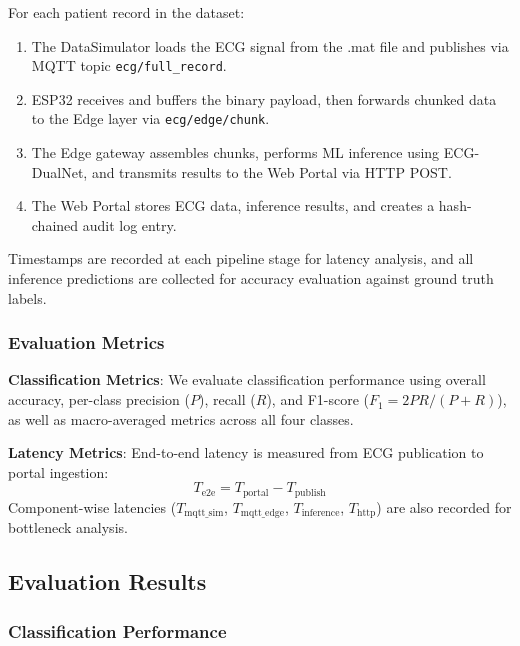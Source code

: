 For each patient record in the dataset:
\begin{enumerate}
    \item The DataSimulator loads the ECG signal from the .mat file and publishes via MQTT topic \texttt{ecg/full\_record}.
    \item ESP32 receives and buffers the binary payload, then forwards chunked data to the Edge layer via \texttt{ecg/edge/chunk}.
    \item The Edge gateway assembles chunks, performs ML inference using ECG-DualNet, and transmits results to the Web Portal via HTTP POST.
    \item The Web Portal stores ECG data, inference results, and creates a hash-chained audit log entry.
\end{enumerate}

Timestamps are recorded at each pipeline stage for latency analysis, and all inference predictions are collected for accuracy evaluation against ground truth labels.

\subsubsection{Evaluation Metrics}

\textbf{Classification Metrics}: We evaluate classification performance using overall accuracy, per-class precision ($P$), recall ($R$), and F1-score ($F_1 = 2PR/(P+R)$), as well as macro-averaged metrics across all four classes.

\textbf{Latency Metrics}: End-to-end latency is measured from ECG publication to portal ingestion:
\begin{equation}
T_{\text{e2e}} = T_{\text{portal}} - T_{\text{publish}}
\end{equation}
Component-wise latencies ($T_{\text{mqtt\_sim}}$, $T_{\text{mqtt\_edge}}$, $T_{\text{inference}}$, $T_{\text{http}}$) are also recorded for bottleneck analysis.

\subsection{Evaluation Results}
\label{subsec:results}

\subsubsection{Classification Performance}

